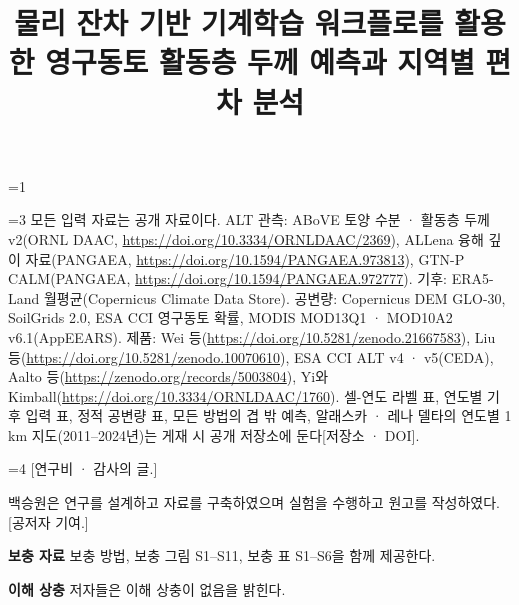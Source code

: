 \providecommand{\frontblock}{0}
\ifnum\frontblock=1
\title[물리 잔차 기반 기계학습의 연도별 활동층 두께 예측]{물리 잔차 기반 기계학습 워크플로를 활용한 영구동토 활동층 두께 예측과 지역별 편차 분석}

\author*[1]{}\email{[교신 저자 전자우편]}
\author[2]{\fnm{[공저자]} \sur{[극지연구소]}}


\fi

\ifnum\frontblock=3
모든 입력 자료는 공개 자료이다. ALT 관측: ABoVE 토양 수분 · 활동층 두께 v2(ORNL DAAC, \url{https://doi.org/10.3334/ORNLDAAC/2369}), ALLena 융해 깊이 자료(PANGAEA, \url{https://doi.org/10.1594/PANGAEA.973813}), GTN-P CALM(PANGAEA, \url{https://doi.org/10.1594/PANGAEA.972777}). 기후: ERA5-Land 월평균(Copernicus Climate Data Store). 공변량: Copernicus DEM GLO-30, SoilGrids 2.0, ESA CCI 영구동토 확률, MODIS MOD13Q1 · MOD10A2 v6.1(AppEEARS). 제품: Wei 등(\url{https://doi.org/10.5281/zenodo.21667583}), Liu 등(\url{https://doi.org/10.5281/zenodo.10070610}), ESA CCI ALT v4 · v5(CEDA), Aalto 등(\url{https://zenodo.org/records/5003804}), Yi와 Kimball(\url{https://doi.org/10.3334/ORNLDAAC/1760}). 셀-연도 라벨 표, 연도별 기후 입력 표, 정적 공변량 표, 모든 방법의 겹 밖 예측, 알래스카 · 레나 델타의 연도별 1 km 지도(2011--2024년)는 게재 시 공개 저장소에 둔다[저장소 · DOI].
\fi

\ifnum\frontblock=4
[연구비 · 감사의 글.]

백승원은 연구를 설계하고 자료를 구축하였으며 실험을 수행하고 원고를 작성하였다. [공저자 기여.]

\textbf{보충 자료} 보충 방법, 보충 그림 S1--S11, 보충 표 S1--S6을 함께 제공한다.

\textbf{이해 상충} 저자들은 이해 상충이 없음을 밝힌다.
\fi
